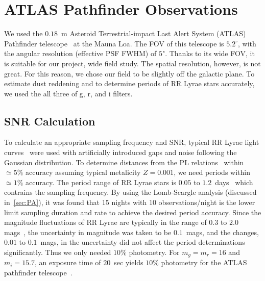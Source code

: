 \documentclass[aps,prb,twocolumn,superscriptaddress]{revtex4-1}
\begin{document}


\section{ATLAS Pathfinder Observations}


We used the $0.18$~m Asteroid Terrestrial-impact Last Alert System (ATLAS) Pathfinder telescope~\citep{fallingstar} at the Mauna Loa. The FOV of this telescope is $5.2^{\circ}$, with the angular resolution (effective PSF FWHM) of $5$". Thanks to its wide FOV, it is suitable for our project, wide field study. The spatial resolution, however, is not great. For this reason, we chose our field to be slightly off the galactic plane. To estimate dust reddening and to determine periods of RR Lyrae stars accurately, we used the all three of g, r, and i filters.



\subsection{SNR Calculation}\label{sec:SNR}

To calculate an appropriate sampling frequency and SNR, typical RR Lyrae light curves~\cite{RRLyrae} were used with artificially introduced gaps and noise following the Gaussian distribution. To determine distances from the PL relations~\citep{PL} within $\simeq5\%$ accuracy assuming typical metalicity $Z=0.001$, we need periods within $\simeq1\%$ accuracy. The period range of RR Lyrae stars is $0.05$ to $1.2$~days~\cite{Astro} which contrains the sampling frequency. By using the Lomb-Scargle analysis (discussed in~\cref{sec:PA}), it was found that 15 nights with 10 observations/night is the lower limit sampling duration and rate to achieve the desired period accuracy. Since the magnitude fluctuations of RR Lyrae are typically in the range of $0.3$ to $2.0$ mags~\cite{AAVSO}, the uncertainty in magnitude was taken to be $0.1$~mags, and the changes, $0.01$ to $0.1$~mags, in the uncertainty did not affect the period determinations significantly. Thus we only needed $10\%$ photometry. For $m_g = m_r = 16$ and $m_i = 15.7$, an exposure time of $20$~sec yields $10\%$ photometry for the ATLAS pathfinder telescope~\citep{fallingstar}.

\end{document}
